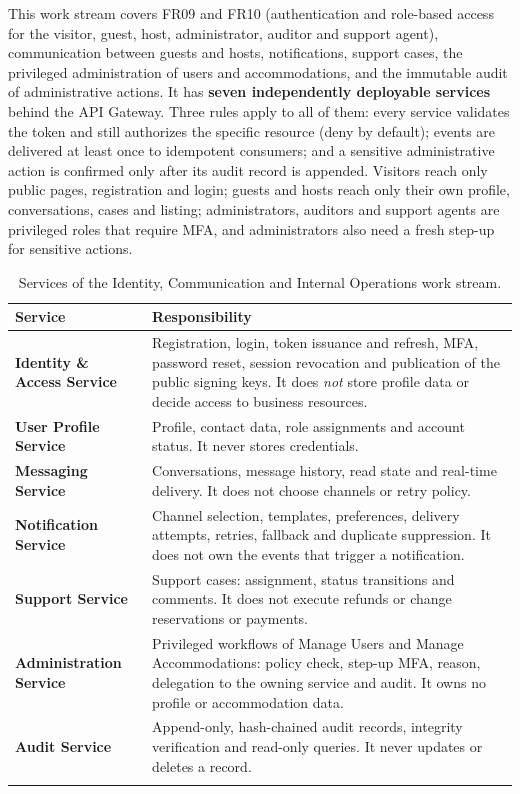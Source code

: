 This work stream covers FR09 and FR10 (authentication and role-based access
for the visitor, guest, host, administrator, auditor and support agent),
communication between guests and hosts, notifications, support cases, the
privileged administration of users and accommodations, and the immutable audit
of administrative actions. It has \textbf{seven independently deployable
services} behind the API Gateway. Three rules apply to all of them: every
service validates the token and still authorizes the specific resource (deny
by default); events are delivered at least once to idempotent consumers; and a
sensitive administrative action is confirmed only after its audit record is
appended. Visitors reach only public pages, registration and login; guests and
hosts reach only their own profile, conversations, cases and listing;
administrators, auditors and support agents are privileged roles that require
MFA, and administrators also need a fresh step-up for sensitive actions.

\begin{longtable}{@{}L{3.1cm}L{10.7cm}@{}}
\toprule
\textbf{Service} & \textbf{Responsibility} \\
\midrule
\endhead
\textbf{Identity \& Access Service} &
  Registration, login, token issuance and refresh, MFA, password reset,
  session revocation and publication of the public signing keys. It does
  \emph{not} store profile data or decide access to business resources. \\
\addlinespace
\textbf{User Profile Service} &
  Profile, contact data, role assignments and account status. It never stores
  credentials. \\
\addlinespace
\textbf{Messaging Service} &
  Conversations, message history, read state and real-time delivery. It does
  not choose channels or retry policy. \\
\addlinespace
\textbf{Notification Service} &
  Channel selection, templates, preferences, delivery attempts, retries,
  fallback and duplicate suppression. It does not own the events that trigger
  a notification. \\
\addlinespace
\textbf{Support Service} &
  Support cases: assignment, status transitions and comments. It does not
  execute refunds or change reservations or payments. \\
\addlinespace
\textbf{Administration Service} &
  Privileged workflows of Manage Users and Manage Accommodations: policy
  check, step-up MFA, reason, delegation to the owning service and audit. It
  owns no profile or accommodation data. \\
\addlinespace
\textbf{Audit Service} &
  Append-only, hash-chained audit records, integrity verification and
  read-only queries. It never updates or deletes a record. \\
\bottomrule
\caption{Services of the Identity, Communication and Internal Operations work
stream.}
\label{tab:id-services}
\end{longtable}

